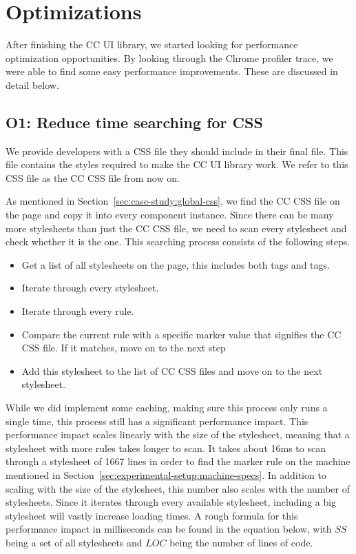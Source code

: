 \section{Optimizations}
After finishing the CC UI library, we started looking for performance optimization opportunities. By looking through the Chrome profiler trace, we were able to find some easy performance improvements. These are discussed in detail below.

\subsection{O1: Reduce time searching for CSS}\label{sec:case-study:searching-for-css}
We provide developers with a CSS file they should include in their final  file. This file contains the styles required to make the CC UI library work. We refer to this CSS file as the CC CSS file from now on.

As mentioned in Section~\ref{sec:case-study:global-css}, we find the CC CSS file on the page and copy it into every component instance. Since there can be many more stylesheets than just the CC CSS file, we need to scan every stylesheet and check whether it is the one. This searching process consists of the following steps.

\begin{itemize}
  \item Get a list of all stylesheets on the page, this includes both  tags and  tags.
  \item Iterate through every stylesheet.
  \item Iterate through every rule.
  \item Compare the current rule with a specific marker value that signifies the CC CSS file. If it matches, move on to the next step
  \item Add this stylesheet to the list of CC CSS files and move on to the next stylesheet.
\end{itemize}

While we did implement some caching, making sure this process only runs a single time, this process still has a significant performance impact. This performance impact scales linearly with the size of the stylesheet, meaning that a stylesheet with more rules takes longer to scan. It takes about 16ms to scan through a stylesheet of 1667 lines in order to find the marker rule on the machine mentioned in Section~\ref{sec:experimental-setup:machine-specs}. In addition to scaling with the size of the stylesheet, this number also scales with the number of stylesheets. Since it iterates through every available stylesheet, including a big stylesheet will vastly increase loading times. A rough formula for this performance impact in milliseconds can be found in the equation below, with \(SS\) being a set of all stylesheets and \(LOC\) being the number of lines of code.

